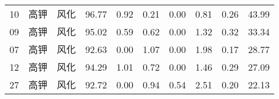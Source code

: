 \documentclass[withoutpreface,bwprint]{cumcmthesis} %
\begin{document}
\begin{appendices}
\begin{table}[!h]
\begin{tabular}{@{}cccccccccc@{}}
		10                                                        & 高钾          & 风化                                                       & 96.77                                                          & 0.92                                                         & 0.21                                                         & 0.00                                                         & 0.81                                                           & 0.26                                                           & 43.99                                                           \\
		09                                                        & 高钾          & 风化                                                       & 95.02                                                          & 0.59                                                         & 0.62                                                         & 0.00                                                         & 1.32                                                           & 0.32                                                           & 33.34                                                           \\
		07                                                        & 高钾          & 风化                                                       & 92.63                                                          & 0.00                                                         & 1.07                                                         & 0.00                                                         & 1.98                                                           & 0.17                                                           & 28.77                                                           \\
		12                                                        & 高钾          & 风化                                                       & 94.29                                                          & 1.01                                                         & 0.72                                                         & 0.00                                                         & 1.46                                                           & 0.29                                                           & 27.09                                                           \\
		27                                                        & 高钾          & 风化                                                       & 92.72                                                          & 0.00                                                         & 0.94                                                         & 0.54                                                         & 2.51                                                           & 0.20                                                           & 22.13                                                           \\

\end{tabular}
\end{table}
\end{appendices}
\end{document}

